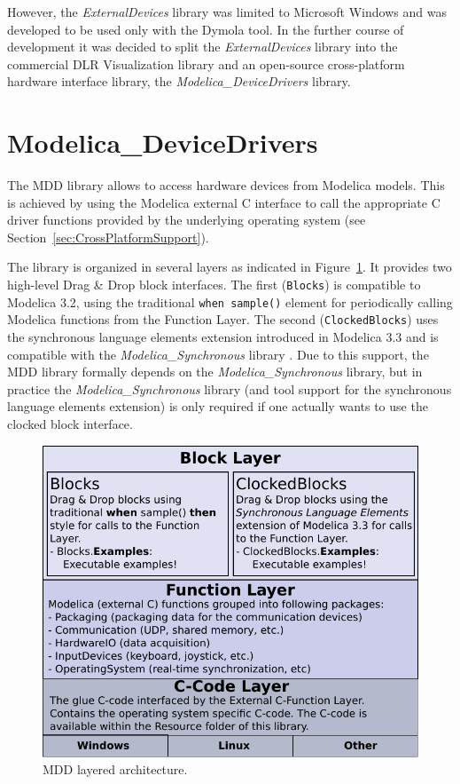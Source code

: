 \documentclass{resources/modelica}
\newcommand{\modelica}[1]{\lstinline[language=modelica]|#1|}
\newcommand{\BTHI}[1]{{\color{blue}{$\parallel_\textrm{BTHI}$#1$\parallel$}}}
\begin{document}
However, the \emph{ExternalDevices} library was limited to
Microsoft Windows and was developed to be used only with
the Dymola tool. In the further course of development it was decided to
split the \emph{ExternalDevices} library into the commercial DLR
Visualization library and an open-source cross-platform hardware interface
library, the \emph{Modelica\_DeviceDrivers} library.




\section{Modelica\_DeviceDrivers}
\label{ModelicaDeviceDrivers}
\BTHI{TODO: Bernhard, Thomas, Volker}

The MDD library allows to access hardware devices from Modelica models.
This is achieved by using the Modelica external C interface to call the
appropriate C driver functions provided by the underlying operating system (see
Section~\ref{sec:CrossPlatformSupport}).

The library is organized in several layers as indicated in
Figure~\ref{fig:MDDLayeredArchitecture}. It
provides two high-level Drag \& Drop block interfaces. The first (\texttt{Blocks}) is
compatible to Modelica 3.2, using the traditional \modelica{when sample()}
element for periodically calling Modelica functions from the \textsf{Function Layer}. The second
(\texttt{ClockedBlocks}) uses the synchronous language elements extension
introduced in Modelica 3.3 and is compatible with the
\emph{Modelica\_Synchronous} library \citep{Otter2012}. Due to this support, the
MDD library formally depends on the \emph{Modelica\_Synchronous} library, but in
practice the \emph{Modelica\_Synchronous} library (and tool support for the
synchronous language elements extension) is only required if one actually wants
to use the clocked block interface.
\begin{figure}[htb]
\begin{center}
  \includegraphics[width=\columnwidth]{figures/MDDLayeredArchitecture}
  \caption{MDD layered architecture.}
  \label{fig:MDDLayeredArchitecture}
\end{center}
\end{figure}
\end{document}
